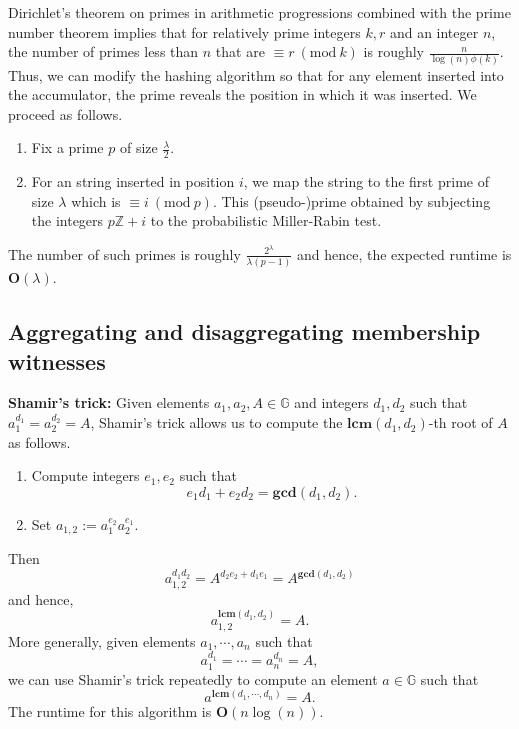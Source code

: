 \documentclass[11pt, lettersize, notitlepage, leqno, footskip=0.6cm]{article}
\newcommand{\bz}{\mathbb Z}
\newcommand{\mb}{\mathbb}
\newcommand{\mbf}{\mathbf}
\newcommand{\lam}{\lambda}
\newcommand{\vs}{\vspace{-0.15cm}}
\newcommand{\noin}{\noindent}
\newcommand{\Mod}[1]{\ (\mathrm{mod}\ #1)}
\newcommand{\LCM}{\mbf{lcm}}
\newcommand{\GCD}{\mbf{gcd}}
\numberwithin{equation}{section}
\begin{document}
Dirichlet's theorem on primes in arithmetic progressions combined with the prime number theorem implies that for relatively prime integers $k,r$ and an integer $n$, the number of primes less than $n$ that are $\equiv r\Mod{k}$ is roughly $\frac{n}{\log(n)\phi(k)}$. Thus, we can modify the hashing algorithm so that for any element inserted into the accumulator, the prime reveals the position in which it was inserted. We proceed as follows.\vspace{0.1cm} \begin{enumerate}[wide, labelwidth=!, labelindent=0pt] 

\item Fix a prime $p$ of size $\frac{\lam}{2}$. 

\item For an string inserted in position $i$, we map the string to the first prime of size $\lam$ which is $\equiv i\Mod{p}$. This (pseudo-)prime obtained by subjecting the integers $p\bz+i$ to the probabilistic Miller-Rabin test. \end{enumerate} \vspace{0.1cm}

\noin The number of such primes is roughly \vs $\frac{2^{\lam}}{\lam (p-1)}$ and hence, the expected runtime is $\mbf{O}(\lam)$.






\subsection{\fontsize{11}{11} Aggregating and disaggregating membership witnesses}

\noindent \textbf{Shamir's trick:} Given elements $a_1, a_2, A\in \mb{G}$ and integers $d_1, d_2$ such that $a_1^{d_1} = a_2^{d_2} = A$, Shamir's trick allows us to compute the $\LCM(d_1, d_2)$-th root of $A$ as follows. \begin{enumerate}[wide, labelwidth=!, labelindent=0pt] 

\item Compute integers $e_1, e_2$ such that \vs $$e_1d_1+e_2d_2 = \GCD(d_1, d_2).$$

\item Set $a_{1,2}:= a_1^{e_2}a_2^{e_1} $. \end{enumerate}

\noindent Then \vspace{-0.15cm}$$a_{1,2}^{d_1d_2} = A^{d_2e_2 + d_1e_1} = A^{\GCD(d_1,d_2)}$$ and hence, \vspace{-0.15cm}$$a_{1,2}^{\LCM(d_1,d_2)} = A.$$ More generally, given elements $a_1,\cdots,a_n$ such that \vs $$a_1^{d_1} = \cdots = a_n^{d_n} = A, $$ we can use Shamir's trick repeatedly to compute an element $a\in\mb{G}$ such that \vs $$a^{\LCM(d_1,\cdots,d_n)} = A.$$ The runtime for this algorithm is $\mbf{O}(n\log(n))$.
\end{document}
